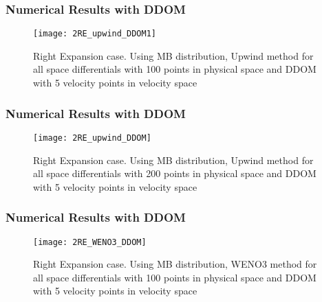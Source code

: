 
\begin{frame}
	\frametitle{Numerical Results with DDOM}
		
		\begin{figure}
			\centering
				\texttt{[image: 2RE\_upwind\_DDOM1]}
			\caption{Right Expansion case. Using MB distribution, Upwind method for all space differentials with 100 points in physical space and DDOM with 5 velocity points in velocity space}
			\label{fig:2RE_upwind_DDOM1}
		\end{figure}
		
\end{frame}

\begin{frame}
	\frametitle{Numerical Results with DDOM}
		
		\begin{figure}
			\centering
				\texttt{[image: 2RE\_upwind\_DDOM]}
			\caption{Right Expansion case. Using MB distribution, Upwind method for all space differentials with 200 points in physical space and DDOM with 5 velocity points in velocity space}
			\label{fig:MB_RE}
		\end{figure}
		
\end{frame}

\begin{frame}
	\frametitle{Numerical Results with DDOM}
		
		\begin{figure}
			\centering
				\texttt{[image: 2RE\_WENO3\_DDOM]}
			\caption{Right Expansion case. Using MB distribution, WENO3 method for all space differentials with 100 points in physical space and DDOM with 5 velocity points in velocity space}
			\label{fig:MB_RE}
		\end{figure}
		
\end{frame}
